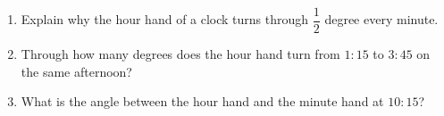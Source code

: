 \begin{enumerate}
\item[(a)] Explain why the hour hand of a clock turns through $\dfrac12$ degree every minute.
\item[(b)] Through how many degrees does the hour hand turn from $1{:}15$ to $3{:}45$ on the same afternoon?
\item[(c)] What is the angle between the hour hand and the minute hand at $10{:}15$?
\end{enumerate}
